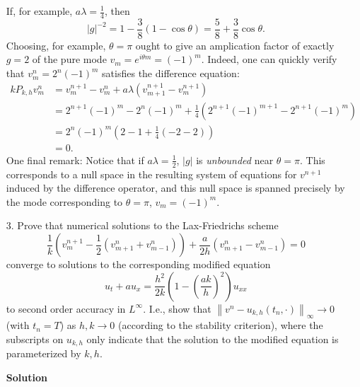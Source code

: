 \documentclass{article}
\providecommand{\abs}[1]{\left\lvert#1\right\rvert}
\providecommand{\norm}[1]{\left\lVert#1\right\rVert}
\begin{document}
\begin{itemize}
If, for example, $a \lambda = \frac{1}{4}$, then
\begin{equation*}
\abs{g}^{-2} = 1 - \frac{3}{8} \left( 1 - \cos \theta \right) = \frac{5}{8} + \frac{3}{8} \cos \theta.
\end{equation*}
Choosing, for example, $\theta = \pi$ ought to give an amplication factor of exactly $g = 2$ of the pure mode $v_m = e^{i \theta m} = (-1)^m$. Indeed, one can quickly verify that $v^n_m = 2^n (-1)^m$ satisfies the difference equation:
\begin{align*}
k P_{k,h} v^n_m
 & = v^{n+1}_m - v^n_m + a \lambda \left( v^{n+1}_{m+1} - v^{n+1}_m \right) \\
 & = 2^{n+1} (-1)^m - 2^n (-1)^m + \frac{1}{4} \left( 2^{n+1} (-1)^{m+1} - 2^{n+1} (-1)^m \right) \\
 & = 2^n (-1)^m \left( 2 - 1 + \frac{1}{4} \left( -2 -2 \right) \right) \\
 & = 0.
\end{align*}
One final remark: Notice that if $a \lambda = \frac{1}{2}$, $\abs{g}$ is \emph{unbounded} near $\theta = \pi$. This corresponds to a null space in the resulting system of equations for $v^{n+1}$ induced by the difference operator, and this null space is spanned precisely by the mode corresponding to $\theta = \pi$, $v_m = (-1)^m$.

\item[3.] Prove that numerical solutions to the Lax-Friedrichs scheme
\begin{equation*}
\frac{1}{k} \left( v^{n+1}_m - \frac{1}{2} \left( v^n_{m+1} + v^n_{m-1} \right) \right) + \frac{a}{2h} \left( v^n_{m+1} - v^n_{m-1} \right) = 0
\end{equation*}
converge to solutions to the corresponding modified equation
\begin{equation*}
u_t + a u_x = \frac{h^2}{2k} \left( 1 - \left( \frac{a k}{h} \right)^2 \right) u_{xx}
\end{equation*}
to second order accuracy in $L^{\infty}$. I.e., show that $\norm{v^n - u_{k,h} \left( t_n, \cdot \right)}_{\infty} \to 0$ (with $t_n = T$) as $h,k \to 0$ (according to the stability criterion), where the subscripts on $u_{k,h}$ only indicate that the solution to the modified equation is parameterized by $k,h$.

\textbf{Solution}


\end{itemize}
\end{document}
